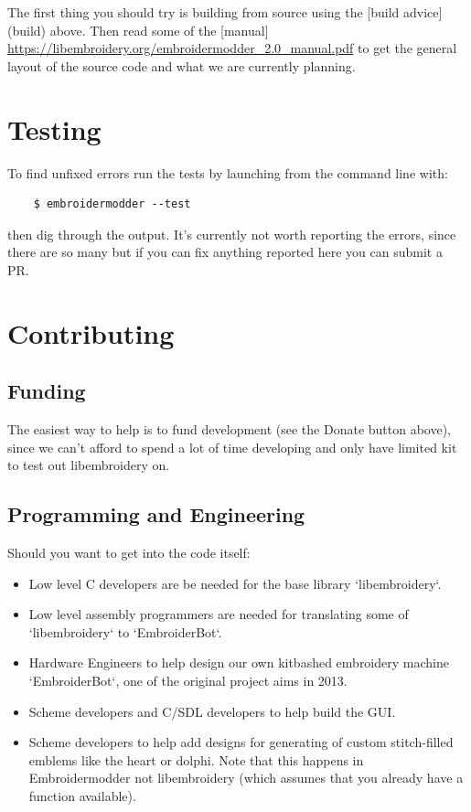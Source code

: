 \documentclass{report}
\begin{document}
The first thing you should try is building from source using the [build advice](build)
above. Then read some of the [manual] \url{https://libembroidery.org/embroidermodder_2.0_manual.pdf} to get the general
layout of the source code and what we are currently planning.

\section{Testing}

To find unfixed errors run the tests by launching from the command line with:

\begin{lstlisting}
    $ embroidermodder --test
\end{lstlisting}

then dig through the output. It's currently not worth reporting the errors, since
there are so many but if you can fix anything reported here you can submit a PR.

\section{Contributing}

\subsection{Funding}

The easiest way to help is to fund development (see the Donate button above),
since we can't afford to spend a lot of time developing and only have limited
kit to test out libembroidery on.

\subsection{Programming and Engineering}

Should you want to get into the code itself:

\begin{itemize}
\item Low level C developers are be needed for the base library `libembroidery`.
\item Low level assembly programmers are needed for translating some of `libembroidery` to `EmbroiderBot`.
\item Hardware Engineers to help design our own kitbashed embroidery machine `EmbroiderBot`, one of the original project aims in 2013.
\item Scheme developers and C/SDL developers to help build the GUI.
\item Scheme developers to help add designs for generating of custom stitch-filled emblems like the heart or dolphi. Note that this happens in Embroidermodder not libembroidery (which assumes that you already have a function available).
\end{itemize}
\end{document}
